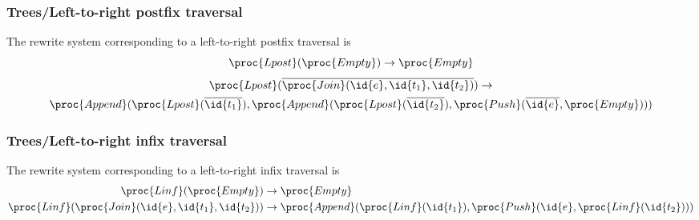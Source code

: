 %
\begin{frame}
\frametitle{Trees/Left-to-right postfix traversal}

The rewrite system corresponding to a left-to-right postfix traversal
is
\[
  \proc{Lpost} (\proc{Empty}) 
\rightarrow \proc{Empty}
\]
\begin{multline*}
  \proc{Lpost} (\overline{\proc{Join} (\id{e}, \id{t_1}, \id{t_2})}) 
\rightarrow\\
  \proc{Append} (\proc{Lpost} (\overline{\id{t_1}}),
     \proc{Append} (\proc{Lpost} (\overline{\id{t_2}}), 
                    \proc{Push} (\overline{\id{e}}, \proc{Empty})))
\end{multline*}

\end{frame}

%
\begin{frame}
\frametitle{Trees/Left-to-right infix traversal}

The rewrite system corresponding to a left-to-right infix traversal is
\begin{align*}
   \proc{Linf} (\proc{Empty}) 
&\rightarrow \proc{Empty}\\
   \proc{Linf} (\proc{Join} (\id{e}, \id{t_1}, \id{t_2})) 
&\rightarrow \proc{Append} (\proc{Linf} (\id{t_1}), 
   \proc{Push} (\id{e}, \proc{Linf} (\id{t_2})))
\end{align*}

\end{frame}
